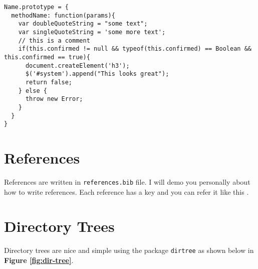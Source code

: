 \begin{lstlisting}[caption=JS Code Snippet]
Name.prototype = {
  methodName: function(params){
    var doubleQuoteString = "some text";
    var singleQuoteString = 'some more text';
    // this is a comment
    if(this.confirmed != null && typeof(this.confirmed) == Boolean && this.confirmed == true){
      document.createElement('h3');
      $('#system').append("This looks great");
      return false;
    } else {
      throw new Error;
    }
  }
}
\end{lstlisting}
\label{lst:listing-main}


\section{References}
References are written in \texttt{references.bib} file. I will demo you personally about how to write references. Each reference has a key and you can refer it like this \cite{Belk:2014}.\\


\section{Directory Trees}
\label{sec:dir-trees}

Directory trees are nice and simple using the package \texttt{dirtree} as shown below in \textbf{Figure \ref{fig:dir-tree}}.

\label{fig:dir-tree}



